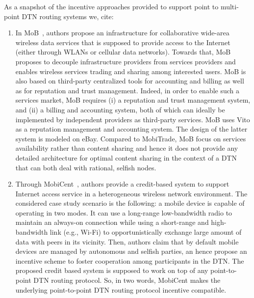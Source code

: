 As a snapshot of the incentive approaches provided to support point to multi-point DTN routing systems we, cite:
\begin{enumerate}

\item In MoB~\cite{MoB}, authors propose an infrastructure for collaborative wide-area wireless data services that is supposed to provide access to the Internet (either through WLANs or cellular data networks). Towards that, MoB proposes to decouple infrastructure providers from services providers and enables wireless services trading and sharing among interested users. MoB is also based on third-party centralized tools for accounting and billing as well as for reputation and trust management. Indeed, in order to enable such a services market, MoB requires (i) a reputation and trust management system, and (ii) a billing and accounting system, both of which can ideally be implemented by independent providers as third-party services. MoB uses Vito as a reputation management and accounting system. The design of the latter system is modeled on eBay. Compared to MobiTrade, MoB focus on services availability rather than content sharing and hence it does not provide any detailed architecture for optimal content sharing in the context of a DTN that can both deal with rational, selfish nodes.

\item Through MobiCent~\cite{MobiCent}, authors provide a credit-based system to support Internet access service in a heterogeneous wireless network environment. The considered case study scenario is the following: a mobile device is capable of operating in two modes. It can use a long-range low-bandwidth radio to maintain an always-on connection while using a short-range and high-bandwidth link (e.g., Wi-Fi) to opportunistically exchange large amount of data with peers in its vicinity. Then, authors
claim that by default mobile devices are managed by autonomous and selfish parties, an hence propose an incentive scheme to foster cooperation among participants in the DTN. The proposed credit based system is supposed to work on top of any point-to-point DTN routing protocol. So, in two words, MobiCent makes the underlying point-to-point DTN routing protocol incentive compatible. 


\end{enumerate}
